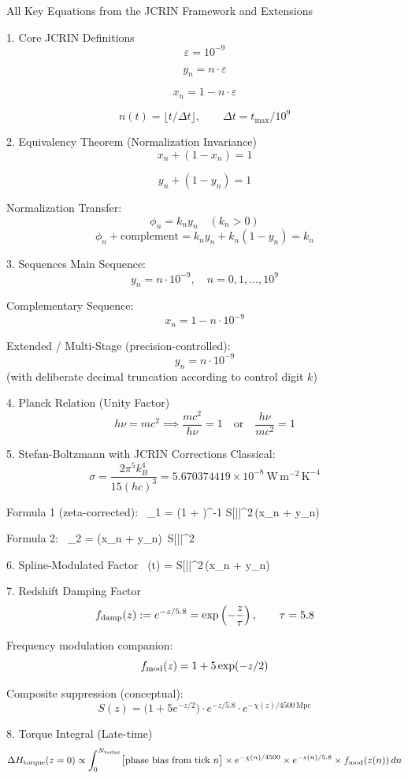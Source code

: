 All Key Equations from the JCRIN Framework and Extensions

1. Core JCRIN Definitions
\[
\varepsilon = 10^{-9}
\]

\[
y_n = n \cdot \varepsilon
\]

\[
x_n = 1 - n \cdot \varepsilon
\]

\[
n(t) = \lfloor t / \Delta t \rfloor, \qquad \Delta t = t_{\max}/10^9
\]

2. Equivalency Theorem (Normalization Invariance)
\[
x_n + (1 - x_n) = 1
\]

\[
y_n + (1 - y_n) = 1
\]

Normalization Transfer:
\[
\phi_n = k_n y_n \quad (k_n > 0)
\]
\[
\phi_n + \text{complement} = k_n y_n + k_n(1 - y_n) = k_n
\]

3. Sequences
Main Sequence:
\[
y_n = n \cdot 10^{-9}, \quad n = 0,1,\dots,10^9
\]

Complementary Sequence:
\[
x_n = 1 - n \cdot 10^{-9}
\]

Extended / Multi-Stage (precision-controlled):
\[
y_n = n \cdot 10^{-9}
\]
(with deliberate decimal truncation according to control digit \(k\))

4. Planck Relation (Unity Factor)
\[
h\nu = m c^2 \implies \frac{m c^2}{h\nu} = 1 \quad \text{or} \quad \frac{h\nu}{m c^2} = 1
\]

5. Stefan-Boltzmann with JCRIN Corrections
Classical:
\[
\sigma = \frac{2\pi^5 k_B^4}{15(h c)^3} = 5.670374419 \times 10^{-8}\ \mathrm{W\,m^{-2}\,K^{-4}}
\]

Formula 1 (zeta-corrected):
\
\sigma_1 = \left(1 + \right)^{-1} \cdot {} \cdot S[|\psi|^2\,(x_n + y_n)
\]

Formula 2:
\
\sigma_2 =  \cdot (x_n + y_n)\, S[|\psi|^2 \cdot {}
\]

6. Spline-Modulated Factor
\
(t) = S[|\psi|^2\,(x_n + y_n)
\]

7. Redshift Damping Factor
\[
f_{\rm damp}(z) := e^{-z/5.8} = \exp\left(-\frac{z}{\tau}\right), \qquad \tau = 5.8
\]

Frequency modulation companion:
\[
f_{\rm mod}(z) = 1 + 5\exp(-z/2)
\]

Composite suppression (conceptual):
\[
S(z) = \bigl(1 + 5 e^{-z/2}\bigr) \cdot e^{-z/5.8} \cdot e^{-\chi(z)/4500\,\mathrm{Mpc}}
\]

8. Torque Integral (Late-time)
\[
\Delta H_{\rm torque}(z=0) \propto \int_0^{N_{\rm today}} \bigl[\text{phase bias from tick }n\bigr] \times e^{-\chi(n)/4500} \times e^{-z(n)/5.8} \times f_{\rm mod}(z(n))\, dn
\]


